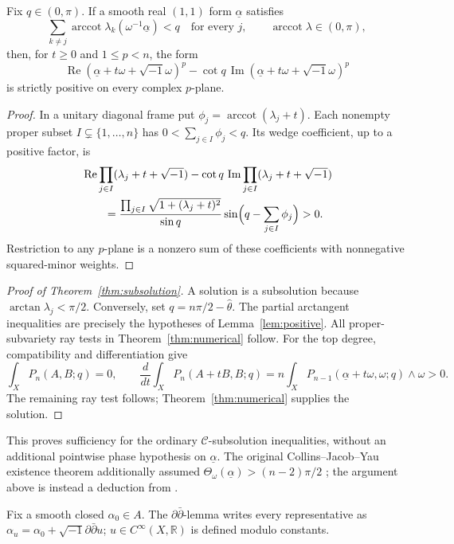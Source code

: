 \documentclass[12pt,reqno]{amsart}
\newcommand{\ii}{\sqrt{-1}}
\newcommand{\ddc}{\ii\partial\bar\partial}
\newcommand{\R}{\mathbb R}
\newcommand{\Rea}{\operatorname{Re}}
\newcommand{\Ima}{\operatorname{Im}}
\begin{document}
\begin{lemma}\label{lem:positive}
Fix $q\in(0,\pi)$. If a smooth real $(1,1)$ form $\underline\alpha$ satisfies
\[
 \sum_{k\ne j}\operatorname{arccot}\lambda_k(\omega^{-1}\underline\alpha)<q
 \quad\text{for every }j,
 \qquad\operatorname{arccot}\lambda\in(0,\pi),
\]
then, for $t\ge0$ and $1\le p<n$, the form
\[
 \Rea(\underline\alpha+t\omega+\ii\omega)^p
 -\cot q\,\Ima(\underline\alpha+t\omega+\ii\omega)^p
\]
is strictly positive on every complex $p$-plane.
\end{lemma}
\begin{proof}\label{proof:positive}
In a unitary diagonal frame put $\phi_j=\operatorname{arccot}(\lambda_j+t)$.
Each nonempty proper subset $I\subsetneq\{1,\ldots,n\}$ has $0<\sum_{j\in I}\phi_j<q$.
Its wedge coefficient, up to a positive factor, is
\[
 \begin{aligned}
 &\Rea\prod_{j\in I}(\lambda_j+t+\ii)
 -\cot q\,\Ima\prod_{j\in I}(\lambda_j+t+\ii)\\
 &\qquad=\frac{\prod_{j\in I}\sqrt{1+(\lambda_j+t)^2}}{\sin q}
   \sin\Bigl(q-\sum_{j\in I}\phi_j\Bigr)>0.
 \end{aligned}
\]
Restriction to any $p$-plane is a nonzero sum of these coefficients with nonnegative squared-minor weights.
\end{proof}

\begin{proof}[Proof of Theorem~\ref{thm:subsolution}]\label{proof:subsolution}
A solution is a subsolution because $\arctan\lambda_j<\pi/2$.
Conversely, set $q=n\pi/2-\widehat\theta$. The partial arctangent inequalities are precisely the hypotheses of Lemma~\ref{lem:positive}. All proper-subvariety ray tests in Theorem~\ref{thm:numerical} follow. For the top degree, compatibility and differentiation give
\[
 \int_X P_n(A,B;q)=0,\qquad
 \frac{d}{dt}\int_XP_n(A+tB,B;q)
 =n\int_XP_{n-1}(\underline\alpha+t\omega,\omega;q)\wedge\omega>0.
\]
The remaining ray test follows; Theorem~\ref{thm:numerical} supplies the solution.
\end{proof}
This proves sufficiency for the ordinary $\mathcal C$-subsolution inequalities, without an additional pointwise phase hypothesis on $\underline\alpha$.
The original Collins--Jacob--Yau existence theorem additionally assumed
$\Theta_\omega(\underline\alpha)>(n-2)\pi/2$ \cite[Theorem 1.2]{CJY}; the argument above is instead a deduction from \cite[Theorem 1.3]{CLT}.

Fix a smooth closed $\alpha_0\in A$. The $\partial\bar\partial$-lemma
writes every representative as $\alpha_u=\alpha_0+\ddc u$;
$u\in C^\infty(X,\R)$ is defined modulo constants.
\end{document}
